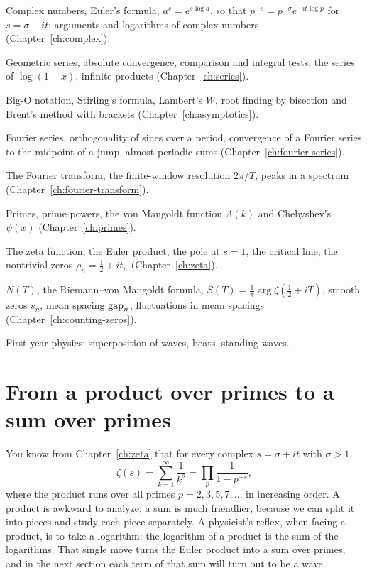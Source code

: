 \begin{prerequisites}
\item Complex numbers, Euler's formula, $a^{s}=e^{s\log a}$, so that $p^{-s}=p^{-\sigma}e^{-it\log p}$ for $s=\sigma+it$; arguments and logarithms of complex numbers (Chapter~\ref{ch:complex}).
\item Geometric series, absolute convergence, comparison and integral tests, the series of $\log(1-x)$, infinite products (Chapter~\ref{ch:series}).
\item Big-O notation, Stirling's formula, Lambert's $W$, root finding by bisection and Brent's method with brackets (Chapter~\ref{ch:asymptotics}).
\item Fourier series, orthogonality of sines over a period, convergence of a Fourier series to the midpoint of a jump, almost-periodic sums (Chapter~\ref{ch:fourier-series}).
\item The Fourier transform, the finite-window resolution $2\pi/T$, peaks in a spectrum (Chapter~\ref{ch:fourier-transform}).
\item Primes, prime powers, the von Mangoldt function $\Lambda(k)$ and Chebyshev's $\psi(x)$ (Chapter~\ref{ch:primes}).
\item The zeta function, the Euler product, the pole at $s=1$, the critical line, the nontrivial zeros $\rho_n=\tfrac12+it_n$ (Chapter~\ref{ch:zeta}).
\item $N(T)$, the Riemann--von Mangoldt formula, $S(T)=\frac1\pi\arg\zeta(\tfrac12+iT)$, smooth zeros $s_n$, mean spacing $\mathrm{gap}_n$, fluctuations in mean spacings (Chapter~\ref{ch:counting-zeros}).
\item First-year physics: superposition of waves, beats, standing waves.
\end{prerequisites}

\section{From a product over primes to a sum over primes}\label{sec:explicit-formula-logzeta}

You know from Chapter~\ref{ch:zeta} that for every complex $s=\sigma+it$ with $\sigma>1$,
\begin{equation}
\zeta(s)=\sum_{k=1}^{\infty}\frac{1}{k^{s}}=\prod_{p}\frac{1}{1-p^{-s}},
\label{eq:explicit-formula-euler}
\end{equation}
where the product runs over all primes $p=2,3,5,7,\dots$ in increasing order. A product is awkward to analyze; a sum is much friendlier, because we can split it into pieces and study each piece separately. A physicist's reflex, when facing a product, is to take a logarithm: the logarithm of a product is the sum of the logarithms. That single move turns the Euler product into a sum over primes, and in the next section each term of that sum will turn out to be a wave.

